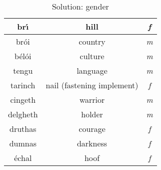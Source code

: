 \begin{table}[H]
{{\begin{tabu}{|c|c|>{\itshape}c|}
      br\'{\i} & hill & f\\
      \midrule
      br\'{o}i & country & m\\
      \midrule
      b\'{e}l\'{o}i & culture & m\\
      \midrule
      tengu & language & m\\
      \midrule
      tarinch & nail (fastening implement) & f\\
      \midrule
      cingeth & warrior & m\\
      \midrule
      delgheth & holder & m\\
      \midrule
      druthas & courage & f\\
      \midrule
      dumnas & darkness & f\\
      \'{e}chal & hoof & f\\
      \bottomrule
    \end{tabu}
  }
}
\label{solution_gender}
\caption{Solution: gender}
\end{table}
